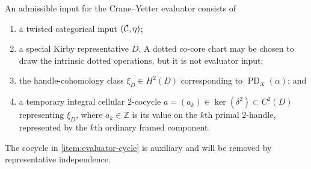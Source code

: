 \begin{definition}
\label{def:admissible-diagrammatic-input}
An admissible input for the Crane--Yetter evaluator consists of
\begin{enumerate}[label=(\roman*),ref=\roman*]
  \item\label{item:evaluator-category}
  a twisted categorical input $(\mathcal{C},\eta)$;

  \item\label{item:evaluator-diagram}
  a special Kirby representative $D$.  A dotted co-core chart may be
  chosen to draw the intrinsic dotted operations, but it is not evaluator
  input;

  \item\label{item:evaluator-marking}
  the handle-cohomology class
  $\xi_D\in H^2(D)$ corresponding to
  $\operatorname{PD}_X(\alpha)$; and

  \item\label{item:evaluator-cycle}
  a temporary integral cellular $2$-cocycle
  $a=(a_k)\in\ker(\delta^2)\subset C^2(D)$ representing $\xi_D$, where
  $a_k\in\mathbb Z$ is its value on the $k$th primal $2$-handle, represented
  by the $k$th ordinary framed component.
\end{enumerate}
The cocycle in \cref{item:evaluator-cycle} is auxiliary and will be
removed by representative independence.
\end{definition}

